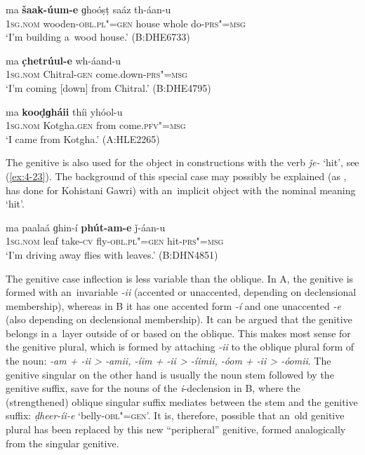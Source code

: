 \begin{exe}
\ex
\label{ex:4-20}
\gll ma \textbf{šaak-úum-e} ɡhoóṣṭ saáz th-áan-u \\
	\textsc{1sg.nom} wooden-\textsc{obl.pl"=gen} house whole do-\textsc{prs"=msg} \\
\glt `I'm building a~wood house.' (B:DHE6733)
\end{exe}

\begin{exe}
\ex
\label{ex:4-21}
\gll ma \textbf{c̣hetrúul-e} wh-áand-u \\
	\textsc{1sg.nom} Chitral-\textsc{gen} come.down-\textsc{prs"=msg} \\
\glt `I'm coming [down] from Chitral.' (B:DHE4795)
\end{exe}

\begin{exe}
\ex
\label{ex:4-22}
\gll ma \textbf{kooḍɡháii} thíi yhóol-u \\
	\textsc{1sg.nom} Kotgha.\textsc{gen} from come.\textsc{pfv"=msg} \\
\glt `I came from Kotgha.' (A:HLE2265)
\end{exe}

The genitive is also used for the object in constructions with the verb \textit{ǰe-} `hit', see (\ref{ex:4-23}). The background of this special case may possibly be explained (as \citealt[43]{baart1999a}, has done for Kohistani Gawri) with an~implicit object with the nominal meaning `hit'.

\begin{exe}
\ex
\label{ex:4-23}
\gll ma paalaá ɡhin-í \textbf{phút-am-e} ǰ-áan-u \\
	\textsc{1sg.nom} leaf take-\textsc{cv} fly-\textsc{obl.pl"=gen} hit-\textsc{prs"=msg} \\
\glt `I'm driving away flies with leaves.' (B:DHN4851)
\end{exe}

The genitive case inflection is less variable than the oblique. In A, the genitive is formed with an~invariable \textit{-ii} (accented or unaccented, depending on declensional membership), whereas in B it has one accented form \textit{-í} and one unaccented \textit{-e} (also depending on declensional membership). It can be argued that the genitive belongs in a~layer outside of or based on the oblique. This makes most sense for the genitive plural, which is formed by attaching \textit{-ii} to the oblique plural form of the noun: \textit{-am + -ii {\textgreater} -amii, -íim + -ii {\textgreater} -íimii, -óom + -ii {\textgreater} -óomii}. The genitive singular on the other hand is usually the noun stem followed by the genitive suffix, save for the nouns of the \textit{i}-declension in B, where the (strengthened) oblique singular suffix mediates between the stem and the genitive suffix: \textit{ḍheer-íi-e} `belly-\textsc{obl"=gen}'. It is, therefore, possible that an~old genitive plural has been replaced by this new ``peripheral'' genitive, formed analogically from the singular genitive.


